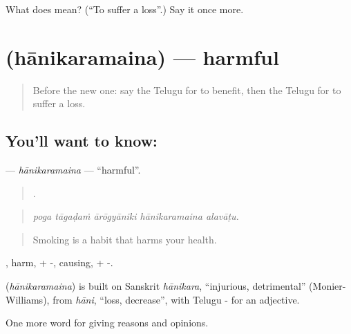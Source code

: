 \begin{tcolorbox}[breakable,colback=teal!4,colframe=teal!35!black,title={Before you move on}]
What does  mean? (\textquotedblleft{}To suffer a loss\textquotedblright{}.) Say it once more.
\end{tcolorbox}
\section[\texorpdfstring{\te{హానికరమైన} (hānikaramaina)}{హానికరమైన (hānikaramaina)}]{ (hānikaramaina) — harmful}

\label{lesson:TE-C393-hanikaramaina}



\begin{quote}
Before the new one: say the Telugu for to benefit, then the Telugu for to suffer a loss.
\end{quote}

\subsection*{You'll want to know: }
\textbf{} — \emph{hānikaramaina} — \textquotedblleft{}harmful\textquotedblright{}.

\begin{quote}
    .
\end{quote}

\begin{quote}
\emph{poga tāgaḍaṁ ārōgyāniki hānikaramaina alavāṭu.}
\end{quote}

\begin{quote}
Smoking is a habit that harms your health.
\end{quote}

, harm, + -, causing, + -.

\begin{cousinweb}
\textbf{} (\emph{hānikaramaina}) is built on Sanskrit \emph{hānikara}, \textquotedblleft{}injurious, detrimental\textquotedblright{} (Monier-Williams), from \emph{hāni}, \textquotedblleft{}loss, decrease\textquotedblright{}, with Telugu - for an adjective.
\end{cousinweb}

\begin{grammarlens}[title={What you've built}]
One more word for giving reasons and opinions.
\end{grammarlens}

